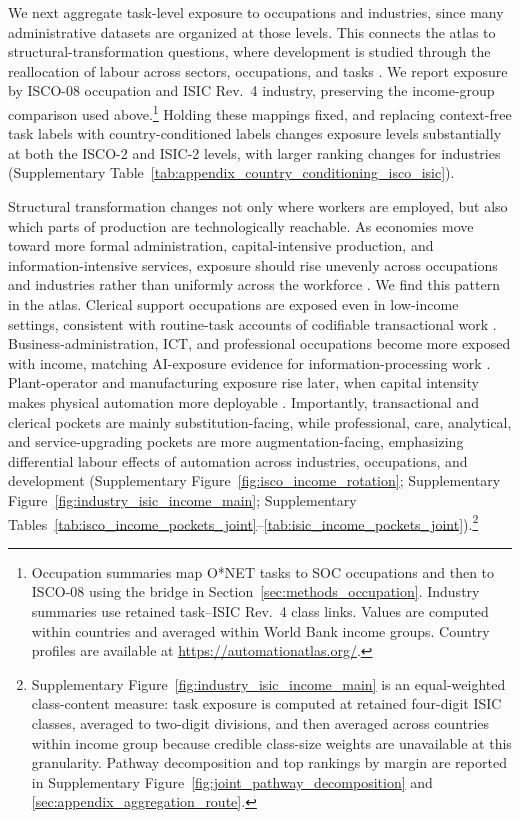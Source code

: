 \documentclass[11pt]{article}
\begin{document}
We next aggregate task-level exposure to occupations and industries, since many administrative datasets are organized at those levels. This connects the atlas to structural-transformation questions, where development is studied through the reallocation of labour across sectors, occupations, and tasks \citep{mcmillan2011_globalization,Rodrik2016PrematureDeindustrializationJEG,CaunedoKellerShin2021,LewandowskiMadonPark2025DevelopmentStages}. We report exposure by ISCO-08 occupation and ISIC Rev.~4 industry, preserving the income-group comparison used above.\footnote{Occupation summaries map O*NET tasks to SOC occupations and then to ISCO-08 using the bridge in Section~\ref{sec:methods_occupation}. Industry summaries use retained task--ISIC Rev.~4 class links. Values are computed within countries and averaged within World Bank income groups. Country profiles are available at \url{https://automationatlas.org/}.} Holding these mappings fixed, and replacing context-free task labels with country-conditioned labels changes exposure levels substantially at both the ISCO-2 and ISIC-2 levels, with larger ranking changes for industries (Supplementary Table~\ref{tab:appendix_country_conditioning_isco_isic}).

Structural transformation changes not only where workers are employed, but also which parts of production are technologically reachable. As economies move toward more formal administration, capital-intensive production, and information-intensive services, exposure should rise unevenly across occupations and industries rather than uniformly across the workforce \citep{mcmillan2011_globalization,Rodrik2016PrematureDeindustrializationJEG,LewandowskiMadonPark2025DevelopmentStages}. We find this pattern in the atlas. Clerical support occupations are exposed even in low-income settings, consistent with routine-task accounts of codifiable transactional work \citep{AutorLevyMurnane2003,goos2014explaining}. Business-administration, ICT, and professional occupations become more exposed with income, matching AI-exposure evidence for information-processing work \citep{felten2021occupational,EloundouEtAl2024,GmyrekBergBescond2023}. Plant-operator and manufacturing exposure rise later, when capital intensity makes physical automation more deployable \citep{graetz2018robots,acemoglu2020robots}. Importantly, transactional and clerical pockets are mainly substitution-facing, while professional, care, analytical, and service-upgrading pockets are more augmentation-facing, emphasizing differential labour effects of automation across industries, occupations, and development (Supplementary Figure~\ref{fig:isco_income_rotation}; Supplementary Figure~\ref{fig:industry_isic_income_main}; Supplementary Tables~\ref{tab:isco_income_pockets_joint}--\ref{tab:isic_income_pockets_joint}).\footnote{Supplementary Figure~\ref{fig:industry_isic_income_main} is an equal-weighted class-content measure: task exposure is computed at retained four-digit ISIC classes, averaged to two-digit divisions, and then averaged across countries within income group because credible class-size weights are unavailable at this granularity. Pathway decomposition and top rankings by margin are reported in Supplementary Figure~\ref{fig:joint_pathway_decomposition} and \ref{sec:appendix_aggregation_route}.}
\end{document}
